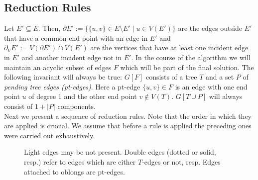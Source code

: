 \documentclass{llncs}
\newcommand{\longversion}[1]{#1}
\newcommand{\shortversion}[1]{}
\newcommand{\scl}{0.67}
\begin{document}
\subsection{Reduction Rules}
Let $E' \subseteq E$. Then, $\partial E':=\{\{u,v\} \in E \setminus E' \mid u \in V(E')\}$ are the edges outside $E'$ that have a common end point with an edge in $E'$ and $\partial_V E':=V(\partial E') \cap V(E')$ are the vertices that have at least one incident edge in $E'$ and another incident edge not in $E'$.
In the course of the algorithm we will maintain an acyclic subset of edges $F$ which will be part of the final solution. The following invariant will always be true: $G[F]$ consists of a tree $T$ and a set $P$ of \emph{pending tree edges (pt-edges)}. Here a pt-edge $\{u,v\} \in F$ is an edge with one end point $u$ of degree $1$ and the other end point $v \not \in V(T)$. $G[T \cup P]$ will always consist of $1+|P|$ components. \\[1ex]
Next we present \longversion{a sequence of}\shortversion{several} reduction rules. \longversion{Note that t}\shortversion{T}he order in which they are applied is crucial\shortversion{: B}\longversion{. We assume that b}efore a rule is applied the preceding ones were carried out exhaustively.

\begin{figure}[bt]
\centering
{}\hspace*{3ex}
\caption{Light edges may be not present. Double edges (dotted or solid, resp.) refer to edges which are either $T$-edges or not, resp. Edges attached to oblongs are pt-edges.}
\label{attach}
\end{figure}
\end{document}
